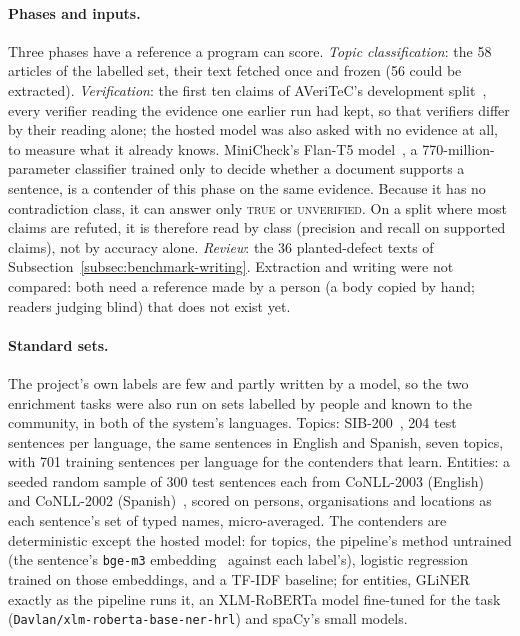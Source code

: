 \paragraph{Phases and inputs.} Three phases have a reference a program
can score. \emph{Topic classification}: the 58 articles of the labelled
set, their text fetched once and frozen (56 could be extracted).
\emph{Verification}: the first ten claims of AVeriTeC's development
split~\cite{schlichtkrull2023averitec}, every verifier reading the
evidence one earlier run had kept, so that verifiers differ by their
reading alone; the hosted model was also asked with no evidence at all,
to measure what it already knows. MiniCheck's Flan-T5
model~\cite{tang2024minicheck}, a 770-million-parameter classifier
trained only to decide whether a document supports a sentence, is a
contender of this phase on the same evidence. Because it has no
contradiction class, it can answer only \textsc{true} or
\textsc{unverified}. On a split where most claims are refuted, it is
therefore read by class (precision and recall on supported claims), not by
accuracy alone. \emph{Review}: the 36 planted-defect
texts of Subsection~\ref{subsec:benchmark-writing}. Extraction and
writing were not compared: both need a reference made by a person (a
body copied by hand; readers judging blind) that does not exist yet.

\paragraph{Standard sets.} The project's own labels are few and partly
written by a model, so the two enrichment tasks were also run on sets
labelled by people and known to the community, in both of the system's
languages. Topics: SIB-200~\cite{adelani2024sib200}, 204 test sentences
per language, the same sentences in English and Spanish, seven topics,
with 701 training sentences per language for the contenders that learn.
Entities: a seeded random sample of 300 test sentences each from
CoNLL-2003 (English)~\cite{tjongkimsang2003conll} and CoNLL-2002
(Spanish)~\cite{tjongkimsang2002conll}, scored on persons,
organisations and locations as each sentence's set of typed names,
micro-averaged. The contenders are deterministic except the hosted
model: for topics, the pipeline's method untrained (the sentence's
\texttt{bge-m3} embedding~\cite{chen2024bgem3} against each label's),
logistic regression trained on those embeddings, and a TF-IDF baseline;
for entities, GLiNER~\cite{zaratiana2024gliner} exactly as the pipeline
runs it, an XLM-RoBERTa model fine-tuned for the task
(\texttt{Davlan/xlm-roberta-base-ner-hrl}) and spaCy's small models.

